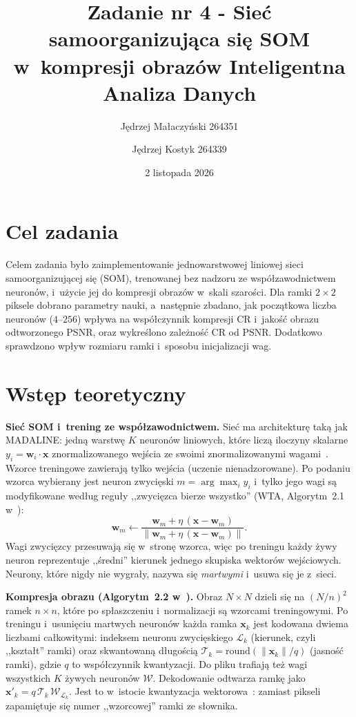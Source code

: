 \documentclass[12pt]{article}
\title{{\bf Zadanie nr 4 - Sieć samoorganizująca się SOM w~kompresji obrazów}\linebreak
Inteligentna Analiza Danych}
\author{Jędrzej Małaczyński 264351 \and Jędrzej Kostyk 264339}
\date{2 listopada 2026}
\begin{document}
\clearpage\maketitle
\thispagestyle{empty}
\newpage
\setcounter{page}{1}
\section{Cel zadania}

Celem zadania było zaimplementowanie jednowarstwowej liniowej sieci samoorganizującej się (SOM),
trenowanej bez nadzoru ze współzawodnictwem neuronów, i~użycie jej do kompresji obrazów
w~skali szarości. Dla ramki $2\times2$ piksele dobrano parametry nauki, a~następnie zbadano,
jak początkowa liczba neuronów ($4$--$256$) wpływa na współczynnik kompresji CR i~jakość obrazu
odtworzonego PSNR, oraz wykreślono zależność CR od PSNR. Dodatkowo sprawdzono wpływ rozmiaru
ramki i~sposobu inicjalizacji wag.

\section{Wstęp teoretyczny}

\textbf{Sieć SOM i~trening ze współzawodnictwem.} Sieć ma architekturę taką jak MADALINE: jedną
warstwę $K$ neuronów liniowych, które liczą iloczyny skalarne $y_i=\mathbf{w}_i\cdot\mathbf{x}$
znormalizowanego wejścia ze swoimi znormalizowanymi wagami~\cite{wyklad3,kohonen1990}. Wzorce
treningowe zawierają tylko wejścia (uczenie nienadzorowane). Po podaniu wzorca wybierany jest
neuron zwycięski $m=\arg\max_i y_i$ i~tylko jego wagi są modyfikowane według reguły
,,zwycięzca bierze wszystko'' (WTA, Algorytm~2.1 w~\cite{wyklad3}):
\begin{equation}
 \mathbf{w}_m \leftarrow \frac{\mathbf{w}_m+\eta\,(\mathbf{x}-\mathbf{w}_m)}{\|\mathbf{w}_m+\eta\,(\mathbf{x}-\mathbf{w}_m)\|} .
 \label{eq_som}
\end{equation}
Wagi zwycięzcy przesuwają się w~stronę wzorca, więc po treningu każdy żywy neuron reprezentuje
,,średni'' kierunek jednego skupiska wektorów wejściowych. Neurony, które nigdy nie wygrały,
nazywa się \emph{martwymi} i~usuwa się je z~sieci.

\textbf{Kompresja obrazu (Algorytm~2.2 w~\cite{wyklad3}).} Obraz $N\times N$ dzieli się na
$(N/n)^2$ ramek $n\times n$, które po spłaszczeniu i~normalizacji są wzorcami treningowymi.
Po treningu i~usunięciu martwych neuronów każda ramka $\mathbf{x}_k$ jest kodowana dwiema liczbami
całkowitymi: indeksem neuronu zwycięskiego $\mathcal{L}_k$ (kierunek, czyli ,,kształt'' ramki) oraz
skwantowaną długością $\mathcal{T}_k=\mathrm{round}(\|\mathbf{x}_k\|/q)$ (jasność ramki), gdzie $q$ to
współczynnik kwantyzacji. Do pliku trafiają też wagi wszystkich $K$ żywych neuronów $\mathcal{W}$.
Dekodowanie odtwarza ramkę jako $\mathbf{x}'_k=q\,\mathcal{T}_k\,\mathcal{W}_{\mathcal{L}_k}$. Jest to
w~istocie kwantyzacja wektorowa~\cite{gray1984}: zamiast pikseli zapamiętuje się numer ,,wzorcowej''
ramki ze słownika.
\end{document}
